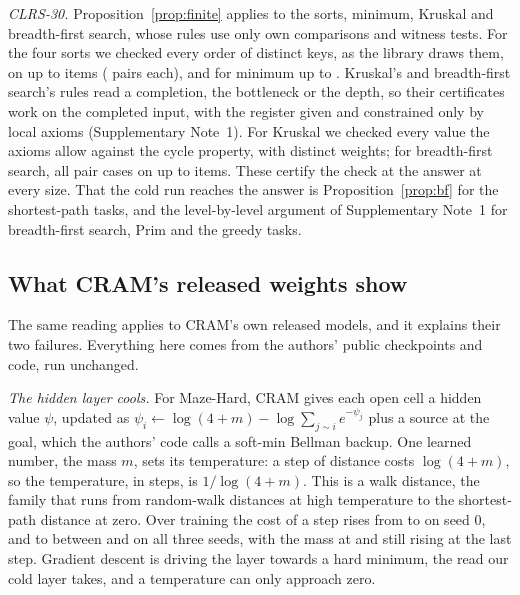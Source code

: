 \emph{CLRS-30.} Proposition~\ref{prop:finite} applies to the sorts, minimum, Kruskal and breadth-first search, whose
rules use only own comparisons and witness tests. For the four sorts we checked every order of distinct keys, as the
library draws them, on up to  items ( pairs each), and for minimum up to
. Kruskal's and breadth-first search's rules read a completion, the bottleneck or the depth, so their
certificates work on the completed input, with the register given and constrained only by local axioms (Supplementary
Note~1). For Kruskal we checked every value the axioms allow against the cycle property, with distinct weights; for
breadth-first search, all  pair cases on up to  items. These certify the check at
the answer at every size. That the cold run reaches the answer is Proposition~\ref{prop:bf} for the shortest-path tasks,
and the level-by-level argument of Supplementary Note~1 for breadth-first search, Prim and the greedy tasks.

\subsection{What CRAM's released weights show}\label{sec:cramweights}

The same reading applies to CRAM's own released models, and it explains their two failures. Everything here comes from
the authors' public checkpoints and code, run unchanged.

\emph{The hidden layer cools.} For Maze-Hard, CRAM gives each open cell a hidden value $\psi$, updated as
$\psi_i \leftarrow \log(4+m) - \log \sum_{j \sim i} e^{-\psi_j}$ plus a source at the goal, which the authors' code
calls a soft-min Bellman backup. One learned number, the mass $m$, sets its temperature: a step of distance costs
$\log(4+m)$, so the temperature, in steps, is $1/\log(4+m)$. This is a walk distance, the family that runs from
random-walk distances at high temperature to the shortest-path distance at zero\cite{chebotarev2012walk,kivimaki2014developments}.
Over training the cost of a step rises from  to  on seed 0, and to between
 and  on all three seeds, with the mass at  and still rising at the
last step. Gradient descent is driving the layer towards a hard minimum, the read our cold layer takes, and a
temperature can only approach zero.

